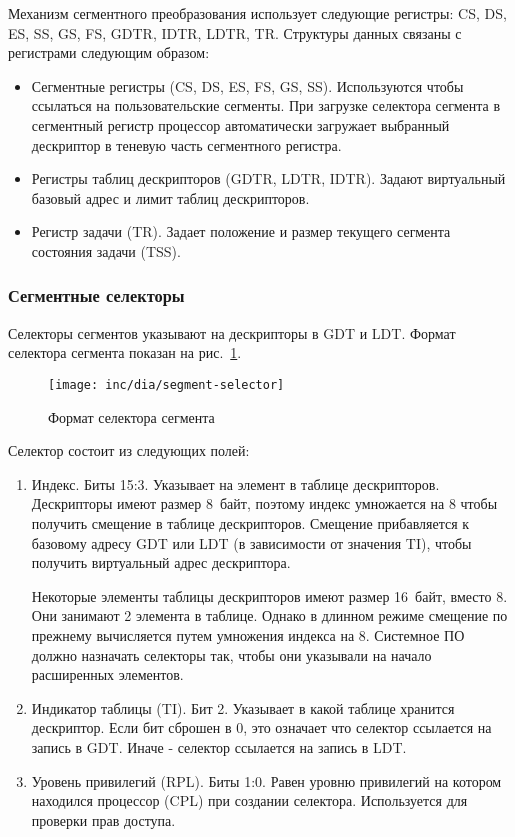 Механизм сегментного преобразования использует следующие регистры: CS, DS, ES, SS, GS, FS, GDTR, IDTR, LDTR, TR.
Структуры данных связаны с регистрами следующим образом:
\begin{itemize}
	\item Сегментные регистры (CS, DS, ES, FS, GS, SS). Используются чтобы ссылаться
		на пользовательские сегменты. При загрузке селектора сегмента в сегментный регистр процессор
		автоматически загружает выбранный дескриптор в теневую часть сегментного регистра.
	\item Регистры таблиц дескрипторов (GDTR, LDTR, IDTR). Задают виртуальный базовый адрес и лимит таблиц дескрипторов.
	\item Регистр задачи (TR). Задает положение и размер текущего сегмента состояния задачи (TSS).
\end{itemize}

\subsubsection*{Сегментные селекторы}
Селекторы сегментов указывают на дескрипторы в GDT и LDT.
Формат селектора сегмента показан на рис.~\ref{fig:segment-selector}.

\begin{figure}[ht!]
  \centering
  \texttt{[image: inc/dia/segment-selector]}
  \caption{Формат селектора сегмента}
  \label{fig:segment-selector}
\end{figure}

Селектор состоит из следующих полей:
\begin{enumerate}[1.]
\item Индекс. Биты 15:3. Указывает на элемент в таблице дескрипторов.
	Дескрипторы имеют размер 8~байт, поэтому индекс умножается на 8
	чтобы получить смещение в таблице дескрипторов. Смещение прибавляется
	к базовому адресу GDT или LDT (в зависимости от значения TI), чтобы получить
	виртуальный адрес дескриптора.

	Некоторые элементы таблицы дескрипторов имеют размер 16~байт, вместо 8.
	Они занимают 2 элемента в таблице. Однако в длинном режиме смещение по
	прежнему вычисляется путем умножения индекса на 8. Системное ПО должно
	назначать селекторы так, чтобы они указывали на начало расширенных элементов.
\item Индикатор таблицы (TI). Бит 2. Указывает в какой таблице хранится дескриптор.
	Если бит сброшен в 0, это означает что селектор ссылается на запись в GDT.
	Иначе - селектор ссылается на запись в LDT.
\item Уровень привилегий (RPL). Биты 1:0. Равен уровню привилегий на котором
	находился процессор (CPL) при создании селектора. Используется для проверки прав доступа.
\end{enumerate}

